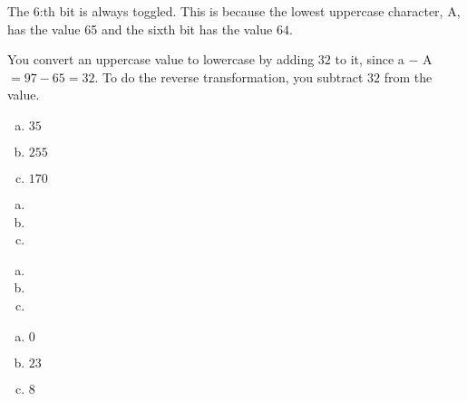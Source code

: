 \begin{Answer}[ref={ascii-uppercase}]

  The 6:th bit is always toggled. This is because the lowest uppercase
  character, A, has the value 65 and the sixth bit has the value $64$.
\end{Answer}

\begin{Answer}[ref={uppercase-conv}]

  You convert an uppercase \ascii value to lowercase by adding $32$ to
  it, since a $-$ A $= 97 - 65 = 32$. To do the reverse transformation,
  you subtract $32$ from the value.

\end{Answer}

\begin{Answer}[ref={hex-to-n}]

  \begin{enumerate}[(a)]
  \item $35$
  \item $255$
  \item $170$
  \end{enumerate}

\end{Answer}

\begin{Answer}[ref={n-to-hex}]

  \begin{enumerate}[(a)]
  \item {}
  \item {}
  \item {}
  \end{enumerate}

\end{Answer}

\begin{Answer}[ref={boolean}]

  \begin{enumerate}[(a)]
  \item \False
  \item \True
  \item \False
  \end{enumerate}

\end{Answer}

\begin{Answer}[ref={bitand}]
  \begin{enumerate}[(a)]
  \item $0$
  \item $23$
  \item $8$
  \end{enumerate}
\end{Answer}

